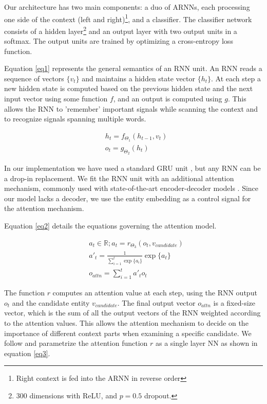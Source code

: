 \documentclass[11pt]{article}
\begin{document}
	Our architecture has two main components: a duo of ARNNs, each processing one side of the context (left and right)\footnote{Right context is fed into the ARNN in reverse order}, and a classifier. The classifier network consists of a hidden layer\footnote{300 dimensions with ReLU, and $p=0.5$ dropout.} and an output layer with two output units in a softmax. The output units are trained by optimizing a cross-entropy loss function. 
	
	Equation \ref{eq1} represents the general semantics of an RNN unit. An RNN reads a sequence of vectors $\{v_t\}$ and maintains a hidden state vector $\{h_t\}$. At each step a new hidden state is computed based on the previous hidden state and the next input vector using some function $f$, and an output is computed using $g$. This allows the RNN to 'remember' important signals while scanning the context and to recognize signals spanning multiple words.
	
	\begin{equation}
	\label{eq1}
	\begin{aligned}
	& h_t=f_{\Theta_1}(h_{t-1}, v_t) \\
	& o_t=g_{\Theta_2}(h_t)
	\end{aligned}
	\end{equation}
	
	In our implementation we have used a standard GRU unit \cite{cho2014learning}, but any RNN can be a drop-in replacement. We fit the RNN unit with an additional attention mechanism, commonly used with state-of-the-art encoder-decoder models \cite{bahdanau2014neural,xu2015show}. Since our model lacks a decoder, we use the entity embedding as a control signal for the attention mechanism.
	
	Equation \ref{eq2} details the equations governing the attention model.
	
	\begin{equation}
	\label{eq2}
	\begin{aligned}
	& a_t \in \mathbb{R}; a_t=r_{\Theta_3}(o_t, v_{candidate}) \\
	& a'_t  = \frac{1}{\sum_{i=1}^{t} \exp\{a_i\}} \exp \{a_t\} \\
	& o_{attn}=\sum_{i=1}^{t} a'_t o_t
	\end{aligned}
	\end{equation}
	
	The function $r$ computes an attention value at each step, using the RNN output $o_t$ and the candidate entity $v_{candidate}$. The final output vector $o_{attn}$ is a fixed-size vector, which is the sum of all the output vectors of the RNN weighted according to the attention values. This allows the attention mechanism to decide on the importance of different context parts when examining a specific candidate. We follow  and parametrize the attention function $r$ as a single layer NN as shown in equation \ref{eq3}.
	
\end{document}
